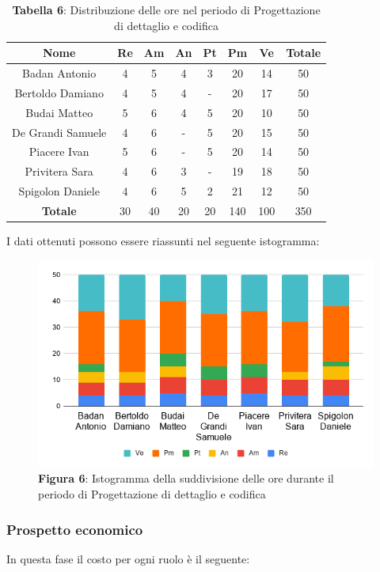 \begin{table}[H]
	\centering
	\renewcommand{\arraystretch}{1.5}
	\begin{tabular}{|c|c|c|c|c|c|c|c|}
		\hline
		\rowcolor{lighter-grayer}
Nome & Re & Am & An & Pt & Pm & Ve & Totale \\ \hline
Badan Antonio & 4 & 5 & 4 & 3 & 20 & 14 & 50 \\ \hline
Bertoldo Damiano & 4 & 5 & 4 & - & 20 & 17 & 50 \\ \hline
Budai Matteo & 5 & 6 & 4 & 5 & 20 & 10 & 50 \\ \hline
De Grandi Samuele & 4 & 6 & - & 5 & 20 & 15 & 50 \\ \hline
Piacere Ivan & 5 & 6 & - & 5 & 20 & 14 & 50 \\ \hline
Privitera Sara & 4 & 6 & 3 & - & 19 & 18 & 50 \\ \hline
Spigolon Daniele & 4 & 6 & 5 & 2 & 21 & 12 & 50 \\ \hline
\textbf{Totale} & 30 & 40 & 20 & 20 & 140 & 100 & 350 \\ \hline
	\end{tabular}
	\caption*{\textbf{Tabella 6}: Distribuzione delle ore nel periodo di Progettazione di dettaglio e codifica\\}
\end{table}	
I dati ottenuti possono essere riassunti nel seguente istogramma:

\begin{figure}[H]
	\centering
	\includegraphics[width=0.7\linewidth]{res/images/IstogrammaFase3.png}
	\caption*{\textbf{Figura 6}: Istogramma della suddivisione delle ore durante il periodo di Progettazione di dettaglio e codifica}
	\label{fig:Figura10}
\end{figure}


\subsubsection{Prospetto economico}
In questa fase il costo per ogni ruolo è il seguente:

